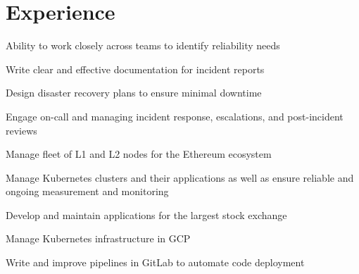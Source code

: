 \documentclass[]{willianpaixao-resume}
\begin{document}
\begin{minipage}[t]{0.64\textwidth}

\section{Experience}
\sectionsep
\begin{tightemize}
\item Ability to work closely across teams to identify reliability needs
\item Write clear and effective documentation for incident reports
\item Design disaster recovery plans to ensure minimal downtime
\end{tightemize}
\sectionsep

\sectionsep
\begin{tightemize}
\item Engage on-call and managing incident response, escalations, and post-incident reviews
\end{tightemize}
\sectionsep

\sectionsep
\begin{tightemize}
\item Manage fleet of L1 and L2 nodes for the Ethereum ecosystem
\item Manage Kubernetes clusters and their applications as well as ensure reliable and ongoing measurement and monitoring
\end{tightemize}
\sectionsep

\sectionsep
\begin{tightemize}
\item Develop and maintain applications for the largest stock exchange
\item Manage Kubernetes infrastructure in GCP
\item Write and improve pipelines in GitLab to automate code deployment
\end{tightemize}
\sectionsep


\end{minipage}
\end{document}
